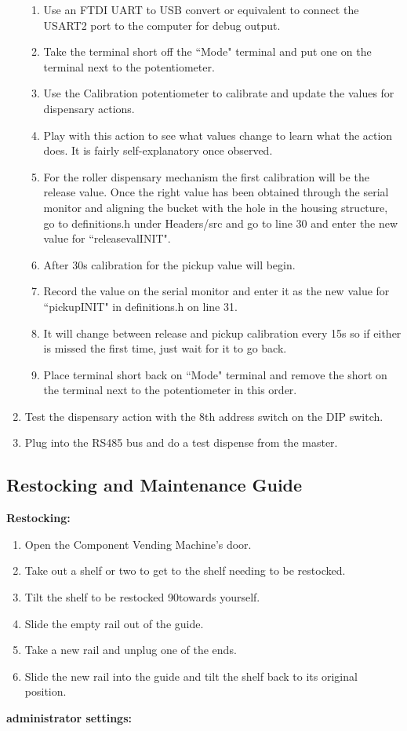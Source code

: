 \documentclass[a4paper,11pt]{article}
\numberwithin{figure}{section}
\numberwithin{table}{section}
\begin{document}
\begin{appendices}
\begin{enumerate}
{\begin{enumerate}
  \item Use an FTDI UART to USB convert or equivalent to connect the USART2 port to the computer for debug output.
  \item Take the terminal short off the ``Mode" terminal and put one on the terminal next to the potentiometer.
  \item Use the Calibration potentiometer to calibrate and update the values for dispensary actions. 
  \item Play with this action to see what values change to learn what the action does. It is fairly self-explanatory once observed.
  \item For the roller dispensary mechanism the first calibration will be the release value. Once the right value has been obtained through the serial monitor and aligning the bucket with the hole in the housing structure, go to definitions.h under Headers/src and go to line 30 and enter the new value for ``releasevalINIT".
  \item After 30s calibration for the pickup value will begin.
  \item Record the value on the serial monitor and enter it as the new value for ``pickupINIT" in definitions.h on line 31.
  \item It will change between release and pickup calibration every 15s so if either is missed the first time, just wait for it to go back.
  \item Place terminal short back on ``Mode" terminal and remove the short on the terminal next to the potentiometer in this order.
  \end{enumerate}}
  \item Test the dispensary action with the 8th address switch on the DIP switch.
  \item Plug into the RS485 bus and do a test dispense from the master.
\end{enumerate}

\subsection{Restocking and Maintenance Guide}
\label{subsec:maintenace}
\textbf{Restocking:}
\begin{enumerate}
\item Open the Component Vending Machine's door.
\item Take out a shelf or two to get to the shelf needing to be restocked.
\item Tilt the shelf to be restocked 90\degree towards yourself.
\item Slide the empty rail out of the guide.
\item Take a new rail and unplug one of the ends.
\item Slide the new rail into the guide and tilt the shelf back to its original position.
\end{enumerate}
\textbf{administrator settings:}


\end{appendices}
\end{document}
